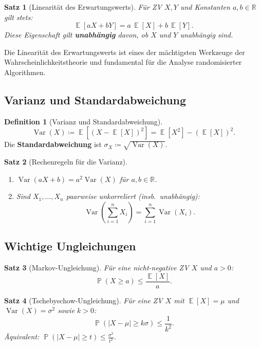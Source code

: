 ﻿\documentclass[12pt,a4paper]{article}
\theoremstyle{definition}
\newtheorem{definition}{Definition}[section]
\theoremstyle{plain}
\newtheorem{satz}{Satz}[section]
\theoremstyle{remark}
\DeclareMathOperator{\E}{\mathbb{E}}
\DeclareMathOperator{\Var}{Var}
\DeclareMathOperator{\Prob}{\mathbb{P}}
\begin{document}
\begin{satz}[Linearität des Erwartungswerts]\label{satz:linear}
  Für ZV $X, Y$ und Konstanten $a, b \in \mathbb{R}$ gilt stets:
  \[
    \E[aX + bY] = a\,\E[X] + b\,\E[Y].
  \]
  Diese Eigenschaft gilt \textbf{unabhängig} davon, ob $X$ und $Y$ unabhängig
  sind.
\end{satz}

Die Linearität des Erwartungswerts ist eines der mächtigsten Werkzeuge der
Wahrscheinlichkeitstheorie und fundamental für die Analyse randomisierter
Algorithmen.

\subsection{Varianz und Standardabweichung}

\begin{definition}[Varianz und Standardabweichung]\label{def:var}
  \[
    \Var(X) \coloneqq \E\!\left[(X - \E[X])^2\right]
    = \E[X^2] - (\E[X])^2.
  \]
  Die \textbf{Standardabweichung} ist $\sigma_X \coloneqq \sqrt{\Var(X)}$.
\end{definition}

\begin{satz}[Rechenregeln für die Varianz]\label{satz:varregeln}
  \begin{enumerate}[label=(\roman*)]
    \item $\Var(aX + b) = a^2 \Var(X)$ für $a, b \in \mathbb{R}$.
    \item Sind $X_1, \ldots, X_n$ paarweise unkorreliert (insb.\ unabhängig):
      \[
        \Var\!\left(\sum_{i=1}^n X_i\right) = \sum_{i=1}^n \Var(X_i).
      \]
  \end{enumerate}
\end{satz}

\subsection{Wichtige Ungleichungen}

\begin{satz}[Markov-Ungleichung]\label{satz:markov}
  Für eine nicht-negative ZV $X$ und $a > 0$:
  \[
    \Prob(X \geq a) \leq \frac{\E[X]}{a}.
  \]
\end{satz}

\begin{satz}[Tschebyschow-Ungleichung]\label{satz:tscheb}
  Für eine ZV $X$ mit $\E[X] = \mu$ und $\Var(X) = \sigma^2$ sowie $k > 0$:
  \[
    \Prob\!\left(|X - \mu| \geq k\sigma\right) \leq \frac{1}{k^2}.
  \]
  Äquivalent: $\Prob(|X-\mu| \geq t) \leq \frac{\sigma^2}{t^2}$.
\end{satz}
\end{document}
